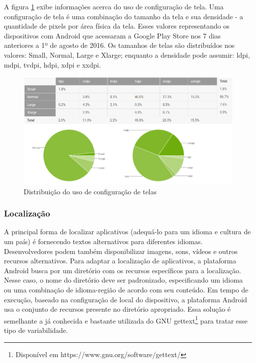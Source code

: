 A figura \ref{fig:screen_configuration} exibe informações acerca do uso de configuração de tela.
Uma configuração de tela é uma combinação do tamanho da tela e sua densidade -
a quantidade de pixels por área física da tela. Esses valores representando os
dispositivos com Android que acessaram a Google Play Store nos 7 dias anteriores
a 1º de agosto de 2016. Os tamanhos de telas são distribuídos nos valores:
Small, Normal, Large e Xlarge; enquanto a densidade pode assumir: ldpi, mdpi,
tvdpi, hdpi, xdpi e xxdpi.

\begin{figure}[ht]
\centering
\includegraphics[width=1\textwidth]{imagens/screen_configuration.png}
\caption{Distribuição do uso de configuração de telas \cite{Dashboard}}
\label{fig:screen_configuration}
\end{figure}

\subsubsection{Localização}

A principal forma de localizar aplicativos (adequá-lo para um idioma e cultura de um país)
é fornecendo textos alternativos para diferentes idiomas. Desenvolvedores podem
também disponibilizar imagens, sons, vídeos e outros recursos alternativos.
Para adaptar a localização de aplicativos, a plataforma Android busca por um
diretório com os recursos específicos para a localização. Nesse caso, o nome do
diretório deve ser padronizado, especificando um idioma ou uma combinação de
idioma-região de acordo com seu conteúdo. Em tempo de execução, baseado na
configuração de local do dispositivo, a plataforma Android usa o conjunto de
recursos presente no diretório apropriado. Essa solução é semelhante a já conhecida
e bastante utilizada do GNU gettext\footnote{Disponível em https://www.gnu.org/software/gettext/}
para tratar esse tipo de variabilidade.

